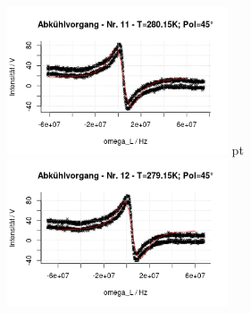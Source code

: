 \documentclass[12pt]{article}
\begin{document}
\begin{minipage}[h!]{\textwidth}
		\includegraphics[width=0.49\textwidth]{figures/cold45-11.png} pt
		\includegraphics[width=0.49\textwidth]{figures/cold45-12.png}\vskip -10pt
\end{minipage}\newpage
\end{document}
